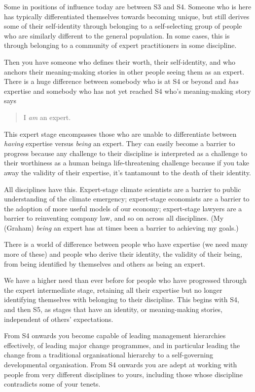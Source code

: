 Some in positions of influence today are between S3 and S4. Someone who is here has typically differentiated themselves towards becoming unique, but still derives some of their self-identity through belonging to a self-selecting group of people who are similarly different to the general population. In some cases, this is through belonging to a community of expert practitioners in some discipline.


Then you have someone who defines their worth, their self-identity, and who anchors their meaning-making stories in other people seeing them as an expert. There is a huge difference between somebody who is at S4 or beyond and \emph{has} expertise and somebody who has not yet reached S4 who's meaning-making story says \begin{quote} I \emph{am} an expert. \end{quote} 


This expert stage encompasses those who are unable to differentiate between \emph{having} expertise versus \emph{being} an expert. They can easily become a barrier to progress because any challenge to their discipline is interpreted as a challenge to their worthiness as a human being\textemdash a life-threatening challenge because if you take away the validity of their expertise, it's tantamount to the death of their identity.


All disciplines have this. Expert-stage climate scientists are a barrier to public understanding of the climate emergency; expert-stage economists are a barrier to the adoption of more useful models of our economy; expert-stage lawyers are a barrier to reinventing company law, and so on across all disciplines. (My (Graham) \emph{being} an expert has at times been a barrier to achieving my goals.)


There is a world of difference between people who have expertise (we need many more of these) and people who derive their identity, the validity of their being, from being identified by themselves and others as being an expert.


We have a higher need than ever before for people who have progressed through the expert intermediate stage, retaining all their expertise but no longer identifying themselves with belonging to their discipline. This begins with S4, and then S5, as stages that have an identity, or meaning-making stories, independent of others’ expectations. 


From S4 onwards you become capable of leading management hierarchies effectively, of leading major change programmes, and in particular leading the change from a traditional organisational hierarchy to a self-governing developmental organisation. From S4 onwards you are adept at working with people from very different disciplines to yours, including those whose discipline contradicts some of your tenets. 



